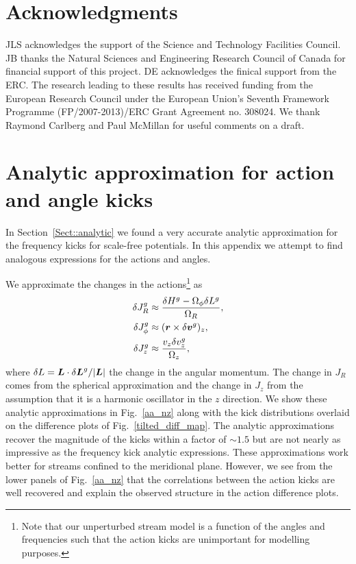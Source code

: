 \documentclass[useAMS,usenatbib,fleqn,a4paper]{mn2e}
\newcommand{\bs}[1]{\bmath{#1}}
\begin{document}
\section*{Acknowledgments}
JLS acknowledges the support of the Science and Technology Facilities
Council. JB thanks the Natural Sciences and Engineering Research
Council of Canada for financial support of this project. DE acknowledges the finical support from the ERC. The research leading to these
results has received funding from the European Research Council under
the European Union's Seventh Framework Programme (FP/2007-2013)/ERC
Grant Agreement no. 308024. We thank Raymond Carlberg and Paul McMillan for useful comments on a draft.




\appendix

\section{Analytic approximation for action and angle kicks}\label{Appendix::Analytic}
In Section~\ref{Sect::analytic} we found a very accurate analytic approximation for the frequency kicks for scale-free potentials. In this appendix we attempt to find analogous expressions for the actions and angles.

We approximate the changes in the actions\footnote{ Note that our unperturbed stream model is a function of the angles and frequencies such that the action kicks are unimportant for modelling purposes.} as
\begin{equation}
\begin{split}
\delta J^g_R &\approx \frac{\delta H^g - \Omega_\phi\delta L^g}{\Omega_R},\\
\delta J^g_\phi &\approx (\bs{r}\times\delta\bs{v}^g)_z,\\
\delta J^g_z &\approx \frac{v_z \delta v^g_z}{\Omega_z},
\end{split}
\label{dJ_an}
\end{equation}
where $\delta L = \bs{L}\cdot\delta\bs{L}^g/|\bs{L}|$ the change in the angular momentum. The change in $J_R$ comes from the spherical approximation and the change in $J_z$ from the assumption that it is a harmonic oscillator in the $z$ direction. We show these analytic approximations in Fig.~\ref{aa_nz} along with the kick distributions overlaid on the difference plots of Fig.~\ref{tilted_diff_map}. The analytic approximations recover the magnitude of the kicks within a factor of $\sim1.5$ but are not nearly as impressive as the frequency kick analytic expressions. These approximations work better for streams confined to the meridional plane. However, we see from the lower panels of Fig.~\ref{aa_nz} that the correlations between the action kicks are well recovered and explain the observed structure in the action difference plots.
\end{document}
